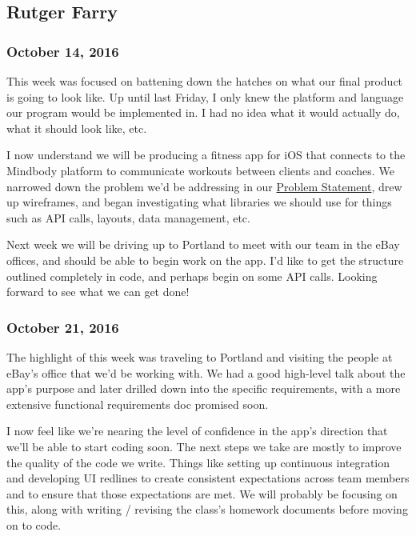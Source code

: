 \subsection{Rutger Farry}
\subsubsection{October 14, 2016}\label{section}
This week was focused on battening down the hatches on what our final
product is going to look like. Up until last Friday, I only knew the
platform and language our program would be implemented in. I had no idea
what it would actually do, what it should look like, etc.

I now understand we will be producing a fitness app for iOS that
connects to the Mindbody platform to communicate workouts between
clients and coaches. We narrowed down the problem we'd be addressing in
our
\href{https://github.com/iOS-Capstone/Problem-Statement/blob/master/ProblemStatement/ProblemStatement.pdf}{Problem
Statement}, drew up wireframes, and began investigating what libraries
we should use for things such as API calls, layouts, data management,
etc.

Next week we will be driving up to Portland to meet with our team in the
eBay offices, and should be able to begin work on the app. I'd like to
get the structure outlined completely in code, and perhaps begin on some
API calls. Looking forward to see what we can get done!

\subsubsection{October 21, 2016}\label{section}
The highlight of this week was traveling to Portland and visiting the
people at eBay's office that we'd be working with. We had a good
high-level talk about the app's purpose and later drilled down into the
specific requirements, with a more extensive functional requirements doc
promised soon.

I now feel like we're nearing the level of confidence in the app's
direction that we'll be able to start coding soon. The next steps we
take are mostly to improve the quality of the code we write. Things like
setting up continuous integration and developing UI redlines to create
consistent expectations across team members and to ensure that those
expectations are met. We will probably be focusing on this, along with
writing / revising the class's homework documents before moving on to
code.

